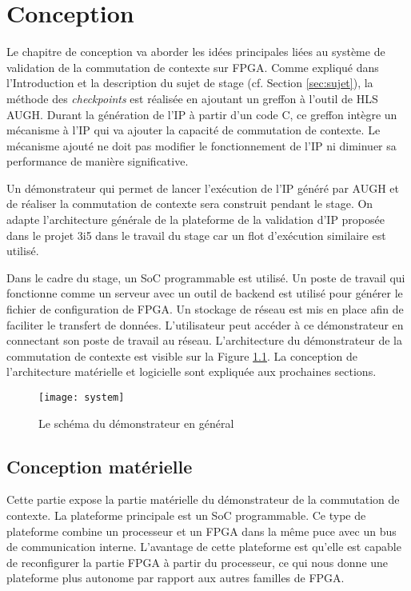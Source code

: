 \chapter{Conception}
\label{chap:concep}
\OnehalfSpacing

Le chapitre de conception va aborder les idées principales liées au système de validation de la commutation de contexte sur FPGA.
Comme expliqué dans l'Introduction et la description du sujet de stage 
(cf. Section \ref{sec:sujet}), la méthode des \emph{checkpoints} 
est réalisée en ajoutant un greffon à l'outil de HLS AUGH.
Durant la génération de l'IP à partir d'un code C, ce greffon intègre un mécanisme à l'IP
qui va ajouter la capacité de commutation de contexte. Le mécanisme
ajouté ne doit pas modifier le fonctionnement de l'IP ni diminuer sa performance de manière significative.

Un démonstrateur qui permet de lancer l'exécution de l'IP généré par AUGH et de réaliser la commutation
de contexte sera construit pendant le stage.
On adapte l'architecture générale de la plateforme de la validation d'IP
proposée dans le projet 3i5\cite{Brisebard2015, Wicaksana2015} dans le travail du stage car
un flot d'exécution similaire est utilisé. 

Dans le cadre du stage, un SoC programmable est utilisé.
Un poste de travail qui fonctionne comme un serveur avec un outil de backend est utilisé pour générer le fichier de configuration de FPGA. 
Un stockage de réseau est mis en place afin de faciliter le transfert de données.
L'utilisateur peut accéder à ce démonstrateur en connectant son poste de travail au réseau.
L'architecture du démonstrateur de la commutation de contexte est visible sur la Figure \ref{fig:system}.
La conception de l'architecture matérielle et logicielle sont expliquée aux prochaines sections.

\begin{figure}[h]
	\centering
	\texttt{[image: system]}
	\caption{Le schéma du démonstrateur en général}
	\label{fig:system}
	\vspace{-2mm}
\end{figure} 

\section{Conception matérielle}
\label{sec:concephard}

Cette partie expose la partie matérielle du démonstrateur de la commutation de contexte.
La plateforme principale est un SoC programmable. Ce type de plateforme
combine un processeur et un FPGA dans la même puce avec un bus de communication interne. L'avantage de cette plateforme
est qu'elle est capable de reconfigurer la partie FPGA à partir du processeur, ce qui nous donne une plateforme plus autonome
par rapport aux autres familles de FPGA.

